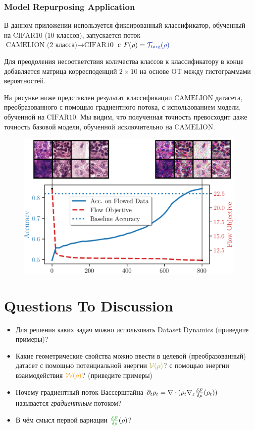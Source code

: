\subsubsection{Model Repurposing Application}

В данном приложении используется фиксированный классификатор, обученный на $\text{CIFAR10}$ (10 классов), запускается поток $\text{CAMELION (2 класса)} \rightarrow \text{CIFAR10}$ с $F(\rho) = \twilight{\cT_{\targ}(\rho)}$

Для преодоления несоответствия количества классов к классификатору в конце добавляется матрица корресподенций $2 \times 10$ на основе OT между гистограммами вероятностей.

На рисунке ниже представлен результат классификации $\text{CAMELION}$ датасета, преобразованного с помощью градиентного потока, с использованием модели, обученной на $\text{CIFAR10}$. Мы видим, что полученная точность превосходит даже точность базовой модели, обученной исключительно на $\text{CAMELION}$. 

\begin{figure}[h]
    \centering
    \includegraphics[width=0.7\linewidth]{chapters/petr_mokrov_s2/figs/model_repurposing.png}
\end{figure}


\section{Questions To Discussion}

\begin{itemize}
    \item Для решения каких задач можно использовать Dataset Dynamics (приведите примеры)?
    \item Какие геометрические свойства можно ввести в целевой (преобразованный) датасет с помощью потенциальной энергии $\olive{\cV(\rho)}$? с помощью энергии взаимодействия $\sunset{\cW(\rho)}$? (приведите примеры)
    \item Почему градиентный поток Вассерштайна $\partial_t \rho_t =  \mathbf{\nabla} \cdot (\rho_t \nabla_{z} \frac{\delta F}{\delta \rho}(\rho_t))$ называется \textit{градиентным} потоком?
    \item В чём смысл первой вариации $\green{\fdv{F}{\rho}}(\rho)$?
\end{itemize}